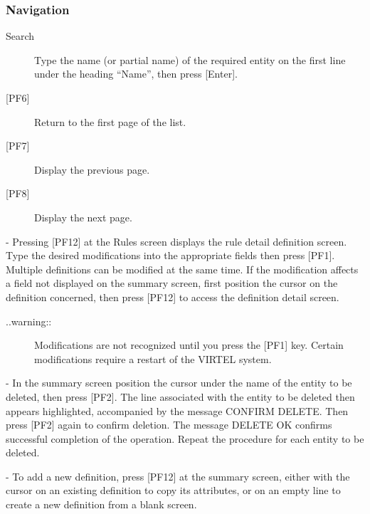 \documentclass[letterpaper,10pt,english]{sphinxmanual}
\begin{document}
\subsubsection{Navigation}
\label{\detokenize{connectivity_guide:id45}}\begin{description}
\item[{Search}] \leavevmode
Type the name (or partial name) of the required entity on the first line under the heading “Name”, then press {[}Enter{]}.

\item[{{[}PF6{]}}] \leavevmode
Return to the first page of the list.

\item[{{[}PF7{]}}] \leavevmode
Display the previous page.

\item[{{[}PF8{]}}] \leavevmode
Display the next page.

\end{description}

 - Pressing {[}PF12{]} at the Rules screen displays the rule detail definition screen. Type the desired modifications into the appropriate fields then press {[}PF1{]}. Multiple definitions can be modified at the same time. If the modification affects a field not displayed on the summary screen, first position the cursor on the definition concerned, then press {[}PF12{]} to access the definition detail screen.
\begin{description}
\item[{..warning::}] \leavevmode
Modifications are not recognized until you press the {[}PF1{]} key. Certain modifications require a restart of the VIRTEL system.

\end{description}

 - In the summary screen position the cursor under the name of the entity to be deleted, then press {[}PF2{]}. The line associated with the entity to be deleted then appears highlighted, accompanied by the message CONFIRM DELETE. Then press {[}PF2{]} again to confirm deletion. The message DELETE OK confirms successful completion of the operation. Repeat the procedure for each entity to be deleted.

 - To add a new definition, press {[}PF12{]} at the summary screen, either with the cursor on an existing definition to copy its attributes, or on an empty line to create a new definition from a blank screen.
\end{document}
